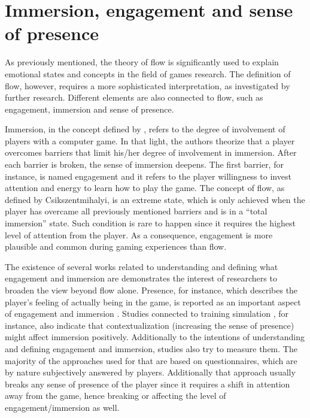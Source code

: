 \section{Immersion, engagement and sense of presence}

As previously mentioned, the theory of flow is significantly used to explain emotional states and concepts in the field of games research. The definition of flow, however, requires a more sophisticated interpretation, as investigated by further research. %
Different elements are also connected to flow, such as engagement, immersion and sense of presence.

Immersion, in the concept defined by \textcite{brown2004grounded}, refers to the degree of involvement of players with a computer game. In that light, the authors theorize that a player overcomes barriers that limit his/her degree of involvement in immersion. After each barrier is broken, the sense of immersion deepens. The first barrier, for instance, is named engagement and it refers to the player willingness to invest attention and energy to learn how to play the game. The concept of flow, as defined by Csikszentmihalyi, is an extreme state, which is only achieved when the player has overcame all previously mentioned barriers and is in a ``total immersion'' state. Such condition is rare to happen since it requires the highest level of attention from the player. As a consequence, engagement is more plausible and common during gaming experiences than flow.

The existence of several works \parencite{boyle2012engagement} related to understanding and defining what engagement and immersion are demonstrates the interest of researchers to broaden the view beyond flow alone. Presence, for instance, which describes the player's feeling of actually being in the game, is reported as an important aspect of engagement and immersion \parencite{weibel2011immersion}. Studies connected to training simulation \parencite{engstrom2016impact}, for instance, also indicate that contextualization (increasing the sense of presence) might affect immersion positively. Additionally to the intentions of understanding and defining engagement and immersion, studies also try to measure them. The majority of the approaches used for that are based on questionnaires, which are by nature subjectively answered by players. Additionally that approach usually breaks any sense of presence of the player since it requires a shift in attention away from the game, hence breaking or affecting the level of engagement/immersion as well.


